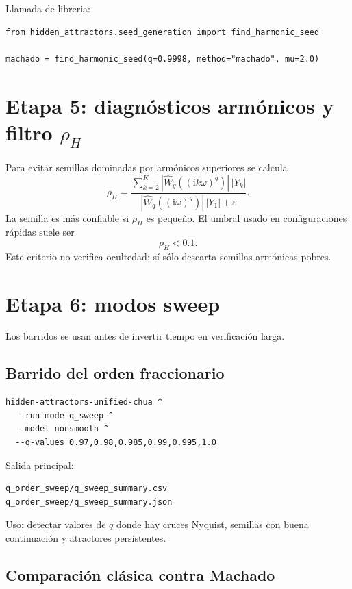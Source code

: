\documentclass[11pt]{article}
\newcommand{\ii}{\mathrm{i}}
\begin{document}
Llamada de libreria:
\begin{lstlisting}
from hidden_attractors.seed_generation import find_harmonic_seed

machado = find_harmonic_seed(q=0.9998, method="machado", mu=2.0)
\end{lstlisting}

\section{Etapa 5: diagnósticos armónicos y filtro \texorpdfstring{$\rho_H$}{rhoH}}

Para evitar semillas dominadas por armónicos superiores se calcula
\begin{equation}
\rho_H=\frac{\sum_{k=2}^{K}|\widehat W_q((\ii k\omega)^q)|\,|Y_k|}{|\widehat W_q((\ii\omega)^q)|\,|Y_1|+\varepsilon}.
\end{equation}
La semilla es más confiable si \(\rho_H\) es pequeño. El umbral usado en configuraciones rápidas suele ser
\begin{equation}
\rho_H<0.1.
\end{equation}
Este criterio no verifica ocultedad; sí sólo descarta semillas armónicas pobres.

\section{Etapa 6: modos sweep}

Los barridos se usan antes de invertir tiempo en verificación larga.

\subsection{Barrido del orden fraccionario}

\begin{lstlisting}
hidden-attractors-unified-chua ^
  --run-mode q_sweep ^
  --model nonsmooth ^
  --q-values 0.97,0.98,0.985,0.99,0.995,1.0
\end{lstlisting}

Salida principal:
\begin{lstlisting}
q_order_sweep/q_sweep_summary.csv
q_order_sweep/q_sweep_summary.json
\end{lstlisting}

Uso: detectar valores de \(q\) donde hay cruces Nyquist, semillas con buena continuación y atractores persistentes.

\subsection{Comparación clásica contra Machado}
\end{document}
